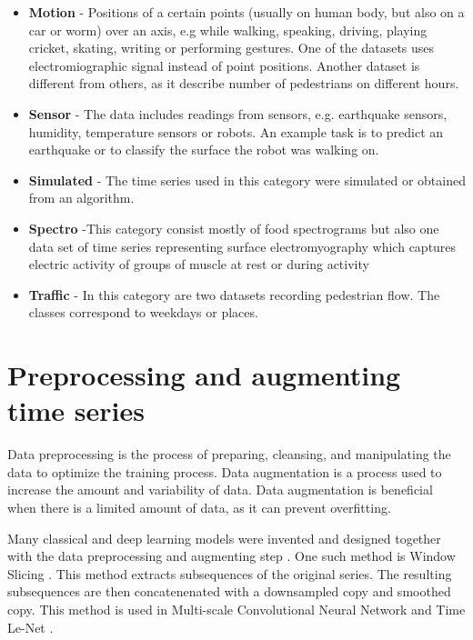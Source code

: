 \documentclass[a4paper,11pt,twoside]{report}
\theoremstyle{definition}
\begin{document}
\begin{itemize}
\item \textbf{Motion} - Positions of a certain points (usually on human body, but also on a car or worm) over an axis, e.g while walking, speaking, driving, playing cricket, skating, writing or performing gestures. One of the datasets uses electromiographic signal instead of point positions. Another dataset is different from others, as it describe number of pedestrians on different hours.


\item \textbf{Sensor} - The data includes readings from sensors, e.g. earthquake sensors, humidity, temperature sensors or robots. An example task is to predict an earthquake or to classify the surface the robot was walking on.

\item \textbf{Simulated} - The time series used in this category were simulated or obtained from an algorithm.

\item \textbf{Spectro} -This category consist mostly of food spectrograms but also one data set of time series representing  surface electromyography which captures electric activity of groups of muscle at rest or during activity

\item \textbf{Traffic} - In this category are two datasets recording pedestrian flow. The classes correspond to weekdays or places.


\end{itemize}


\section{Preprocessing and augmenting time series}
Data preprocessing is the process of preparing, cleansing, and manipulating the data to optimize the training process. Data augmentation is a process used to increase the amount and variability of data. Data augmentation is beneficial when there is a limited amount of data, as it can prevent overfitting.

Many classical and deep learning models were invented and designed together with the data preprocessing and augmenting step \cite{bake_off, dl_tsc}. One such method is Window Slicing \cite{dl_tsc}. This method extracts subsequences of the original series. The resulting subsequences are then concatenenated with a downsampled copy and smoothed copy. This method is used in Multi-scale Convolutional Neural Network \cite{multiscale} and Time Le-Net \cite{timelenet}.
\end{document}
